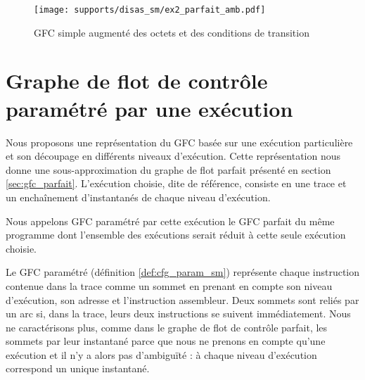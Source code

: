 \begin{figure}[h]
\begin{center}
  \texttt{[image: supports/disas\_sm/ex2\_parfait\_amb.pdf]}
\end{center}
\caption{GFC simple augmenté des octets et des conditions de transition}
\label{fig:sm_cfg_parfait_amb}
\end{figure}

\section{Graphe de flot de contrôle paramétré par une exécution}
Nous proposons une représentation du GFC basée sur une exécution particulière et son découpage en différents niveaux d'exécution.
Cette représentation nous donne une sous-approximation du graphe de flot parfait présenté en section \ref{sec:gfc_parfait}.
L'exécution choisie, dite de référence, consiste en une trace et un enchaînement d'instantanés de chaque niveau d'exécution.

Nous appelons GFC paramétré par cette exécution le GFC parfait du même programme dont l'ensemble des exécutions serait réduit à cette seule exécution choisie.
% 

Le GFC paramétré (définition \ref{def:cfg_param_sm}) représente chaque instruction contenue dans la trace comme un sommet en prenant en compte son niveau d'exécution, son adresse et l'instruction assembleur. Deux sommets sont reliés par un arc si, dans la trace, leurs deux instructions se suivent immédiatement.
Nous ne caractérisons plus, comme dans le graphe de flot de contrôle parfait, les sommets par leur instantané parce que nous ne prenons en compte qu'une exécution et il n'y a alors pas d’ambiguïté : à chaque niveau d'exécution correspond un unique instantané.

